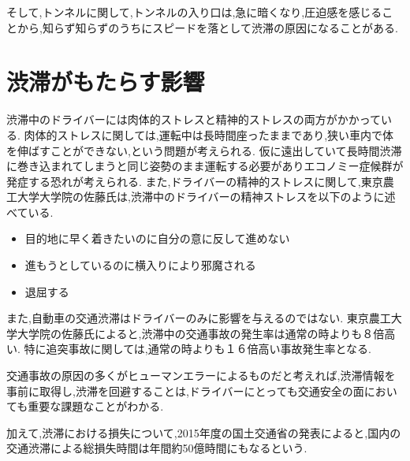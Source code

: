 そして,トンネルに関して,トンネルの入り口は,急に暗くなり,圧迫感を感じることから,知らず知らずのうちにスピードを落として渋滞の原因になることがある\cite{zurich}.

\newpage


\section{渋滞がもたらす影響}
渋滞中のドライバーには肉体的ストレスと精神的ストレスの両方がかかっている.
肉体的ストレスに関しては,運転中は長時間座ったままであり,狭い車内で体を伸ばすことができない,という問題が考えられる.
仮に遠出していて長時間渋滞に巻き込まれてしまうと同じ姿勢のまま運転する必要がありエコノミー症候群が発症する恐れが考えられる.
また,ドライバーの精神的ストレスに関して,東京農工大学大学院の佐藤氏\cite{alma99344256104031}は,渋滞中のドライバーの精神ストレスを以下のように述べている.


\begin{itemize}
  \item 目的地に早く着きたいのに自分の意に反して進めない \\
  \item 進もうとしているのに横入りにより邪魔される \\
  \item 退屈する \\
\end{itemize}



また,自動車の交通渋滞はドライバーのみに影響を与えるのではない.
東京農工大学大学院の佐藤氏によると,渋滞中の交通事故の発生率は通常の時よりも８倍高い\cite{alma99344256104031}.
特に追突事故に関しては,通常の時よりも１６倍高い事故発生率となる.

交通事故の原因の多くがヒューマンエラーによるものだと考えれば,渋滞情報を事前に取得し,渋滞を回避することは,ドライバーにとっても交通安全の面においても重要な課題なことがわかる.

加えて,渋滞における損失について,2015年度の国土交通省の発表によると,国内の交通渋滞による総損失時間は年間約50億時間にもなるという\cite{kokudo_jam}\cite{nissei}.
\newpage

